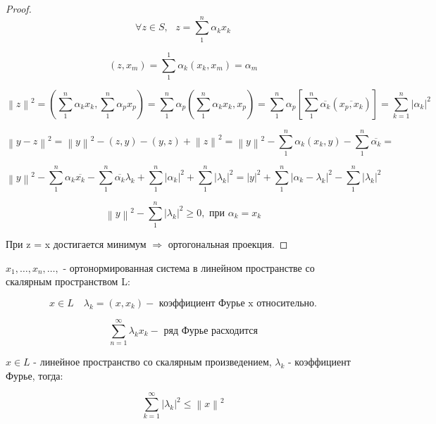\documentclass[12pt, a4paper]{report}
\begin{document}
\begin{proof}
    \[ \forall  z \in  S , \text{ }  z = \sum_{1} ^ n \alpha_k x_k  \] 

    \[  (z, x_m ) = \sum  _1 ^1 \alpha_k (x_k , x_m ) = \alpha_m \] 

    \[ \left\lVert z  \right\rVert ^2 = \left(  \sum  _ 1 ^ n \alpha_k x_k ,  \sum  _ 1 ^ n \alpha_p x_p  \right)  = \sum  _ 1 ^ n \alpha_p \left( \sum_1 ^ n \alpha_k x_k , x_p  \right) =\sum  _1 ^ n \alpha_p \left[ \sum  _1 ^ n \overline{\alpha_k } (\overline{x_p, x_k}  )   \right] =  \sum  _{k =1 }  ^{ n} \left\lvert  \alpha_k     \right\rvert  ^2 \]  

    \[ \left\lVert y -z  \right\rVert ^2 = \left\lVert y   \right\rVert ^2 - ( z, y ) -  ( y , z ) + \left\lVert z   \right\rVert ^2 = \left\lVert y  \right\rVert ^2 - \sum   _ 1 ^ n \alpha_k(x_k, y ) - \sum_{ 1} ^ n \overline{\alpha_k}  =  \]

    \[ \left\lVert y  \right\rVert ^2 - \sum_{ 1 } ^ n \alpha_k \overline{x_k} - \sum_{ 1 } ^ n \overline{\alpha_k }\lambda_k +\sum_{ 1 } ^ n \left\lvert \alpha_k   \right\rvert ^2 + \sum_{ 1 } ^ n \left\lvert \lambda_k      \right\rvert ^2 = \left\lvert  y  \right\rvert ^2 + \sum_{ 1 } ^ n \left\lvert  \alpha_k - \lambda_k \right\rvert ^2  -\sum_{ 1 } ^ n \left\lvert \lambda_k     \right\rvert ^2       \] 

    \[ \left\lVert y  \right\rVert ^2 - \sum_{ 1 } ^ n \left\lvert \lambda_k     \right\rvert ^2 \geq 0  , \text{ при }  \alpha_k = x_k \] 

    При z = x  достигается минимум \( \Rightarrow   \)  ортогональная проекция.

\end{proof}

\begin{definition}
    \( x_1, \ldots, x_n, \ldots,  \)  - ортонормированная система в линейном пространстве со скалярным пространством L: 

    \[ x \in  L \quad  \lambda_k = ( x , x_k ) - \text{ коэффициент Фурье x относительно.}  \] 

    \[ \sum_{ n= 1 } ^{\infty } \lambda_k x_k - \text{ ряд Фурье расходится}  \] 


\end{definition}

\begin{theorem}    
    \( x \in  L  \)  - линейное пространство со скалярным произведением, \( \lambda_k  \)  - коэффициент Фурье, тогда:

    \[ \sum_{k =1}^{\infty  } \left\lvert  \lambda_k     \right\rvert ^2 \le  \left\lVert x  \right\rVert ^2  \] 


\end{theorem}
\end{document}
